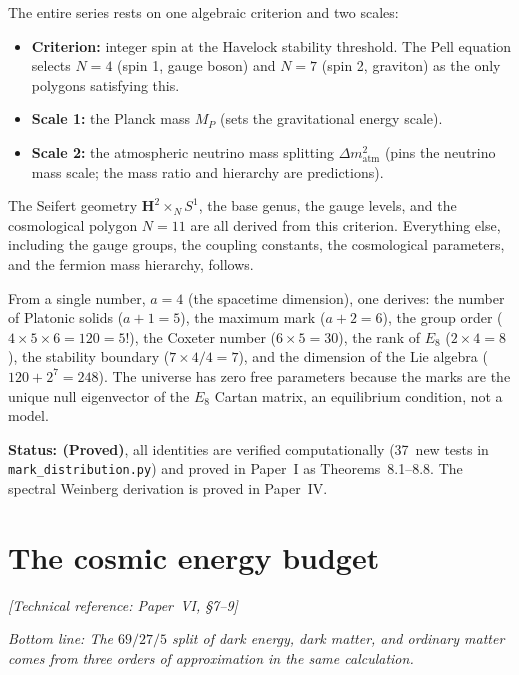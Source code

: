 The entire series rests on one algebraic criterion and two scales:
\begin{itemize}
\item \textbf{Criterion:} integer spin at the Havelock stability
  threshold.  The Pell equation selects $N = 4$ (spin 1, gauge boson)
  and $N = 7$ (spin 2, graviton) as the only polygons satisfying this.
\item \textbf{Scale 1:} the Planck mass $M_P$ (sets the gravitational
  energy scale).
\item \textbf{Scale 2:} the atmospheric neutrino mass splitting
  $\Delta m^2_{\mathrm{atm}}$ (pins the neutrino mass scale;
  the mass ratio and hierarchy are predictions).
\end{itemize}
The Seifert geometry $\mathbf{H}^2 \times_N S^1$, the base genus,
the gauge levels, and the cosmological polygon $N = 11$ are all
derived from this criterion.
Everything else, including the gauge groups, the coupling constants,
the cosmological parameters, and the fermion mass hierarchy,
follows.

From a single number, $a = 4$ (the spacetime dimension), one derives:
the number of Platonic solids ($a{+}1 = 5$), the maximum mark ($a{+}2 = 6$),
the group order ($4 \times 5 \times 6 = 120 = 5!$),
the Coxeter number ($6 \times 5 = 30$), the rank of $E_8$ ($2 \times 4 = 8$),
the stability boundary ($7 \times 4/4 = 7$), and the dimension of the
Lie algebra ($120 + 2^7 = 248$).  The universe has zero free parameters
because the marks are the unique null eigenvector of the $E_8$ Cartan
matrix, an equilibrium condition, not a model.

\textbf{Status: (Proved)}, all identities are verified computationally
(37~new tests in \texttt{mark\_distribution.py}) and proved in Paper~I as
Theorems~8.1--8.8.  The spectral Weinberg derivation is proved in Paper~IV.

\section{The cosmic energy budget}
\noindent\textit{[Technical reference: Paper~VI, \S7--9]}

\medskip

\noindent\textit{Bottom line: The $69/27/5$ split of dark energy, dark
matter, and ordinary matter comes from three orders of approximation
in the same calculation.}

\medskip

